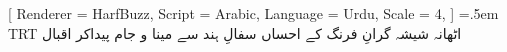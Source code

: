 \documentclass[varwidth=1000pt,border={250pt 50pt}]{standalone}
\begin{document}
\parindent=0pt

[
    Renderer = HarfBuzz,
      Script = Arabic,
    Language = Urdu,
       Scale = 4,
]
\lineskip=.5em
\textdir TRT
اٹھانہ شیشہ گرانِ فرنگ کے احساں\linebreak
سفالِ ہند سے مینا و جام پیداکر\linebreak
\small{اقبال}
\end{document}
